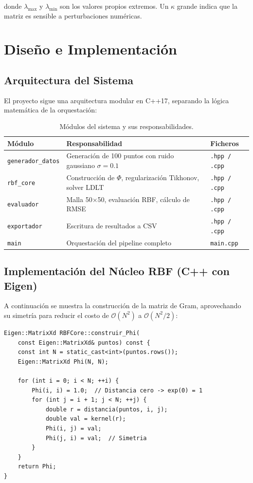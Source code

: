 \documentclass[12pt,a4paper]{article}
\theoremstyle{definition}
\begin{document}
donde $\lambda_{\max}$ y $\lambda_{\min}$ son los valores propios extremos. Un $\kappa$ grande indica que la matriz es sensible a perturbaciones num\'{e}ricas.

\section{Dise\~{n}o e Implementaci\'{o}n}\label{sec:implementacion}

\subsection{Arquitectura del Sistema}

El proyecto sigue una arquitectura modular en C++17, separando la l\'{o}gica matem\'{a}tica de la orquestaci\'{o}n:

\begin{table}[H]
\centering
\caption{M\'{o}dulos del sistema y sus responsabilidades.}
\label{tab:modulos}
\begin{tabular}{@{}lp{7cm}l@{}}
\toprule
\textbf{M\'{o}dulo} & \textbf{Responsabilidad} & \textbf{Ficheros} \\
\midrule
\texttt{generador\_datos} & Generaci\'{o}n de 100 puntos con ruido gaussiano $\sigma=0.1$ & \texttt{.hpp / .cpp} \\
\texttt{rbf\_core} & Construcci\'{o}n de $\Phi$, regularizaci\'{o}n Tikhonov, solver LDLT & \texttt{.hpp / .cpp} \\
\texttt{evaluador} & Malla 50$\times$50, evaluaci\'{o}n RBF, c\'{a}lculo de RMSE & \texttt{.hpp / .cpp} \\
\texttt{exportador} & Escritura de resultados a CSV & \texttt{.hpp / .cpp} \\
\texttt{main} & Orquestaci\'{o}n del pipeline completo & \texttt{main.cpp} \\
\bottomrule
\end{tabular}
\end{table}

\subsection{Implementaci\'{o}n del N\'{u}cleo RBF (C++ con Eigen)}

A continuaci\'{o}n se muestra la construcci\'{o}n de la matriz de Gram, aprovechando su simetr\'{i}a para reducir el costo de $\mathcal{O}(N^2)$ a $\mathcal{O}(N^2/2)$:

\begin{lstlisting}[caption={Construcci\'{o}n de $\Phi$ con simetr\'{i}a optimizada.}]
Eigen::MatrixXd RBFCore::construir_Phi(
    const Eigen::MatrixXd& puntos) const {
    const int N = static_cast<int>(puntos.rows());
    Eigen::MatrixXd Phi(N, N);
    
    for (int i = 0; i < N; ++i) {
        Phi(i, i) = 1.0;  // Distancia cero -> exp(0) = 1
        for (int j = i + 1; j < N; ++j) {
            double r = distancia(puntos, i, j);
            double val = kernel(r);
            Phi(i, j) = val;
            Phi(j, i) = val;  // Simetria
        }
    }
    return Phi;
}
\end{lstlisting}
\end{document}
